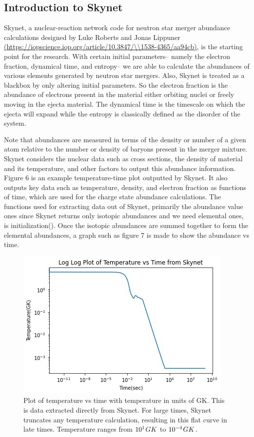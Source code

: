 \documentclass[11pt,a4paper]{article}
\begin{document}
\subsection{Introduction to Skynet}

Skynet, a nuclear-reaction network code for neutron star merger abundance calculations designed by Luke Roberts and Jonas Lippuner \url{(https://iopscience.iop.org/article/10.3847/\\1538-4365/aa94cb)}, is the starting point for the research. With certain initial parameters-- namely the electron fraction, dynamical time, and entropy-- we are able to calculate the abundances of various elements generated by neutron star mergers. Also, Skynet is treated as a blackbox by only altering initial parameters. So the electron fraction is the abundance of electrons present in the material either orbiting nuclei or freely moving in the ejecta material. The dynamical time is the timescale on which the ejecta will expand while the entropy is classically defined as the disorder of the system.

Note that abundances are measured in terms of the density or number of a given atom relative to the number or density of baryons present in the merger mixture. Skynet considers the nuclear data such as cross sections, the density of material and its temperature, and other factors to output this abundance information. Figure 6 is an example temperature-time plot outputted by Skynet. It also outputs key data such as temperature, density, and electron fraction as functions of time, which are used for the charge state abundance calculations. The functions used for extracting data out of Skynet, primarily the abundance value ones since Skynet returns only isotopic abundances and we need elemental ones, is initialization(). Once the isotopic abundances are summed together to form the elemental abundances, a graph such as figure 7 is made to show the abundance vs time. 

\begin{figure}[h!]
  \includegraphics[scale = .75]{skynet_non_linear.png}
  \centering
  \caption{Plot of temperature vs time with temperature in units of GK. This is data extracted directly from Skynet. For large times, Skynet truncates any temperature calculation, resulting in this flat curve in late times. Temperature ranges from $10^1 \hspace{.03 cm} GK$ to $10^{-4} \hspace{.03 cm} GK$.}
\end{figure}
\end{document}

